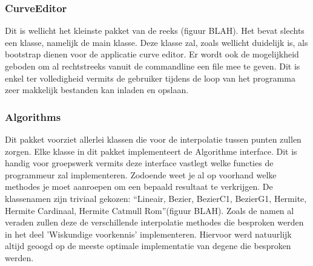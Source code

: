 \documentclass[a4paper,11pt,oneside, titlepage]{article}
\begin{document}
\subsubsection{CurveEditor}
Dit is wellicht het kleinste pakket van de reeks (figuur BLAH). Het bevat slechts een klasse, 
namelijk de 
main klasse. Deze klasse zal, zoals wellicht duidelijk is, als bootstrap dienen voor de 
applicatie curve editor. Er wordt ook de mogelijkheid geboden om al rechtstreeks vanuit
de commandline een file mee te geven. Dit is enkel ter volledigheid vermits de gebruiker tijdens
de loop van het programma zeer makkelijk bestanden kan inladen en opslaan.
\subsubsection{Algorithms}
Dit pakket voorziet allerlei klassen die voor de interpolatie tussen punten zullen zorgen.
Elke klasse in dit pakket implementeert de Algorithme interface. Dit is handig voor  
groepswerk vermits deze interface vastlegt welke functies de programmeur zal implementeren.
Zodoende weet je al op voorhand welke methodes je moet aanroepen om een bepaald resultaat
te verkrijgen. \newline
De klassenamen zijn triviaal gekozen: ``Lineair, Bezier, BezierC1, BezierG1, Hermite, 
Hermite Cardinaal, Hermite Catmull Rom''(figuur BLAH). 
Zoals de namen al veraden zullen deze de verschillende
interpolatie methodes die besproken werden in het deel 'Wiskundige voorkennis' implementeren.
Hiervoor werd natuurlijk altijd geoogd op de meeste optimale implementatie van degene die 
besproken werden.
\end{document}
